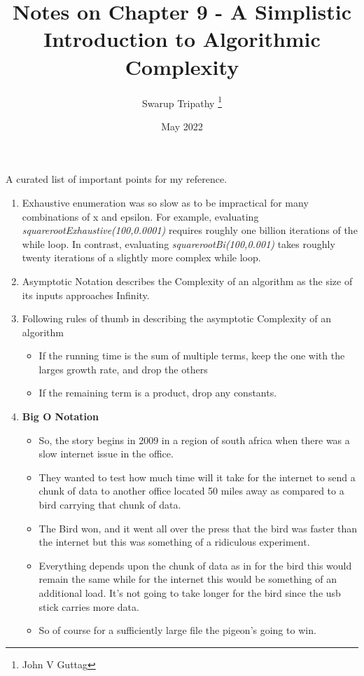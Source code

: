 \documentclass[11pt]{article}
\title{Notes on Chapter 9 - A Simplistic Introduction to Algorithmic Complexity}
\author{Swarup Tripathy \thanks{John V Guttag}}
\date{May 2022}
\begin{document}
    \maketitle
    A curated list of important points for my reference.\\
    \begin{enumerate}
        \item Exhaustive enumeration was so slow as to be impractical for many combinations of x and epsilon. 
        For example, evaluating \textit{squarerootExhaustive(100,0.0001)} requires roughly one billion iterations of the while loop.
        In contrast, evaluating \textit{squarerootBi(100,0.001)} takes roughly twenty iterations of a slightly more complex while loop.
        \item Asymptotic Notation describes the Complexity of an algorithm as the size of its inputs approaches Infinity.
        \item Following rules of thumb in describing the asymptotic Complexity of an algorithm
        \begin{itemize}
            \item If the running time is the sum of multiple terms, keep the one with the larges growth rate, and drop the others
            \item If the remaining term is a product, drop any constants.
        \end{itemize}
        \item \textbf{Big O Notation}
        \begin{itemize}
            \item So, the story begins in 2009 in a region of south africa when there was a slow internet issue in the office.
            \item They wanted to test how much time will it take for the internet to send a chunk of data to another office located 50 miles away as compared to a bird carrying that chunk of data.
            \item The Bird won, and it went all over the press that the bird was faster than the internet but this was something of a ridiculous experiment.
            \item Everything depends upon the chunk of data as in for the bird this would remain the same while for the internet this would be something of an additional load. It's not going to take longer for the bird since the usb stick carries more data.
            \item So of course for a sufficiently large file the pigeon's going to win.

\end{itemize}
\end{enumerate}
\end{document}
